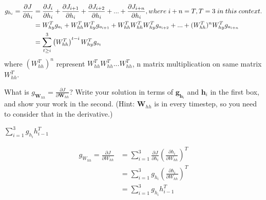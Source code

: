 \documentclass[11pt,addpoints,answers]{exam}
\newcommand{\gv}{\mathbf{g}}
\newcommand{\hv}{\mathbf{h}}
\newcommand{\Wv}{\mathbf{W}}
\begin{document}
\begin{questions}
\begin{parts}
\begin{subparts}
\begin{subsubparts}
\begin{your_solution}[title=Work,height=6cm,width=14cm]
    \[
    \begin{aligned}
    	g_{h_i} = \frac{\partial J}{\partial h_i} &=  \frac{\partial J_{i}}{\partial h_i} + \frac{\partial J_{i+1}}{\partial h_i} + \frac{\partial J_{i+2}}{\partial h_i} + ... +\frac{\partial J_{i+n}}{\partial h_i}, where \hspace{1mm} i+n = T, T=3 \hspace{1mm} in\hspace{1mm} this\hspace{1mm} context. \\
    	&= W_{hy}^Tg_{o_{i}} + W_{hh}^TW_{hy}^Tg_{o_{i+1}} + W_{hh}^TW_{hh}^TW_{hy}^Tg_{o_{i+2}} + ... + (W_{hh}^T)^nW_{hy}^Tg_{o_{i+n}} \\
    	&= \sum_{t \geq i}^{3} \left(W_{hh}^T\right)^{t-i} W_{hy}^T g_{o_t}
    \end{aligned}
    \]
    where $(W_{hh}^T)^n$ represent $W_{hh}^TW_{hh}^T...W_{hh}^T$, n matrix multiplication on same matrix $W_{hh}^T$.
    \end{your_solution}
    
    \subsubpart[3] What is $g_{\Wv_{hh}} = \frac{\partial J}{\partial \Wv_{hh}}$? Write your solution in terms of $\gv_{\hv_i}$ and $\hv_i$ in the first box, and show your work in the second. (Hint: $\Wv_{hh}$ is in every timestep, so you need to consider that in the derivative.)
    
    
    \begin{your_solution}[title=$\frac{\partial J}{\partial \Wv_{hh}}$,height=2.5cm,width=10.5cm]
    $\sum_{i=1}^{3} g_{h_i} h_{i-1}^T$
    \end{your_solution}
    
    \begin{your_solution}[title=Work,height=6.5cm,width=14cm]
    \[
	\begin{aligned}    
		g_{W_{hh}} = \frac{\partial J}{\partial W_{hh}} &= \sum_{i=1}^{3} \frac{\partial J}{\partial h_i} \left( \frac{\partial 	h_i}{\partial W_{hh}} \right)^T \\
		&= \sum_{i=1}^{3} g_{h_i} \left( \frac{\partial h_i}{\partial W_{hh}} \right)^T \\
		&= \sum_{i=1}^{3} g_{h_i} h_{i-1}^T
	\end{aligned}
	\]        
    \end{your_solution}\\
    \end{subsubparts}
    
\end{subparts}



\end{parts}
\end{questions}
\end{document}
